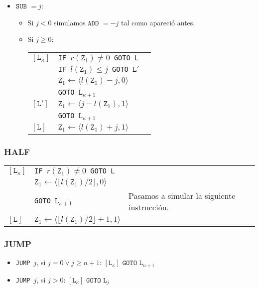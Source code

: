 \documentclass[twoside]{article}
\begin{document}
\begin{itemize}
\item $\texttt{SUB }=j$:

\begin{itemize}
\item Si $j<0$ simulamos $\texttt{ADD }=-j$ tal como apareció antes.

\item Si $j\geq 0$:

\begin{tabular}{l l l}
$[\texttt{L}_\kappa]$&\texttt{IF }$r(\texttt{Z}_1)\neq 0$\texttt{ GOTO L}\\
&\texttt{IF }$l(\texttt{Z}_1)\leq j$\texttt{ GOTO }$\texttt{L}'$&\\
&$\texttt{Z}_1\leftarrow \langle l(\texttt{Z}_1)-j,0\rangle$\\
&\texttt{GOTO }$\texttt{L}_{\kappa+1}$& \\
$[\texttt{L}']$&$\texttt{Z}_1\leftarrow \langle j-l(\texttt{Z}_1),1\rangle$\\
&\texttt{GOTO }$\texttt{L}_{\kappa+1}$& \\
$[\texttt{L}]$&$\texttt{Z}_1\leftarrow \langle l(\texttt{Z}_1)+j,1\rangle$
\end{tabular}
\end{itemize}


\end{itemize}

\subsubsection{HALF}
\begin{tabular}{l l l}
$[\texttt{L}_\kappa]$ & \texttt{IF }$r(\texttt{Z}_1)\neq 0$\texttt{ GOTO L}\\
&$\texttt{Z}_1\leftarrow\langle\lfloor l(\texttt{Z}_1)/2\rfloor, 0\rangle$ &\\
&\texttt{GOTO }$\texttt{L}_{\kappa+1}$ & Pasamos a simular la siguiente instrucción.\\
$[\texttt{L}]$ & $\texttt{Z}_1\leftarrow\langle\lfloor l(\texttt{Z}_1)/2\rfloor+1, 1\rangle$ & 
\end{tabular}

\newpage

\subsubsection{JUMP}
\begin{itemize}
\item \texttt{JUMP }$j$, si $j=0\lor j\geq n+1$:
$[\texttt{L}_\kappa]\texttt{ GOTO }\texttt{L}_{n+1}$
\item \texttt{JUMP }$j$, si $j>0$:
$[\texttt{L}_\kappa]\texttt{ GOTO }\texttt{L}_{j}$
\end{itemize}
\end{document}
